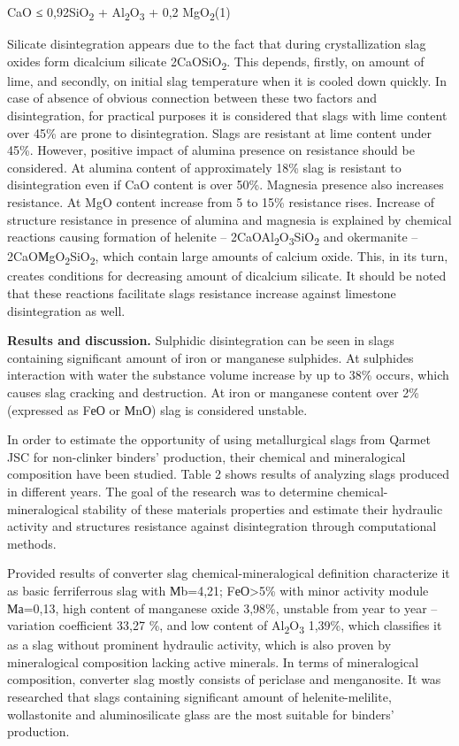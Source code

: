 \begin{multicols}{2}
CaO ≤ 0,92SiO\textsubscript{2} + Al\textsubscript{2}O\textsubscript{3} +
0,2 MgO\textsubscript{2}\hfill (1)

Silicate disintegration appears due to the fact that during
crystallization slag oxides form dicalcium silicate
2CaOSiO\textsubscript{2}. This depends, firstly, on amount of lime, and
secondly, on initial slag temperature when it is cooled down quickly. In
case of absence of obvious connection between these two factors and
disintegration, for practical purposes it is considered that slags with
lime content over 45\% are prone to disintegration. Slags are resistant
at lime content under 45\%. However, positive impact of alumina presence
on resistance should be considered. At alumina content of approximately
18\% slag is resistant to disintegration even if CaO content is over
50\%. Magnesia presence also increases resistance. At MgO content
increase from 5 to 15\% resistance rises. Increase of structure
resistance in presence of alumina and magnesia is explained by chemical
reactions causing formation of helenite --
2CaOAl\textsubscript{2}O\textsubscript{3}SiO\textsubscript{2} and
okermanite -- 2CaOМgO\textsubscript{2}SiO\textsubscript{2}, which
contain large amounts of calcium oxide. This, in its turn, creates
conditions for decreasing amount of dicalcium silicate. It should be
noted that these reactions facilitate slags resistance increase against
limestone disintegration as well.

{\bfseries Results and discussion.} Sulphidic disintegration can be seen in
slags containing significant amount of iron or manganese sulphides. At
sulphides\textquotesingle{} interaction with water the substance volume
increase by up to 38\% occurs, which causes slag cracking and
destruction. At iron or manganese content over 2\% (expressed as FеО or
МnО) slag is considered unstable.

In order to estimate the opportunity of using metallurgical slags from
Qarmet JSC for non-clinker binders' production, their chemical and
mineralogical composition have been studied. Table 2 shows results of
analyzing slags produced in different years. The goal of the research
was to determine chemical-mineralogical stability of these
materials\textquotesingle{} properties and estimate their hydraulic
activity and structure\textquotesingle s resistance against
disintegration through computational methods.

Provided results of converter slag chemical-mineralogical definition
characterize it as basic ferriferrous slag with Мb=4,21;
FеО\textgreater5\% with minor activity module Ма=0,13, high content of
manganese oxide 3,98\%, unstable from year to year -- variation
coefficient 33,27 \%, and low content of
Al\textsubscript{2}O\textsubscript{3} 1,39\%, which classifies it as a
slag without prominent hydraulic activity, which is also proven by
mineralogical composition lacking active minerals. In terms of
mineralogical composition, converter slag mostly consists of periclase
and menganosite. It was researched that slags containing significant
amount of helenite-melilite, wollastonite and aluminosilicate glass are
the most suitable for binders' production.


\end{multicols}

